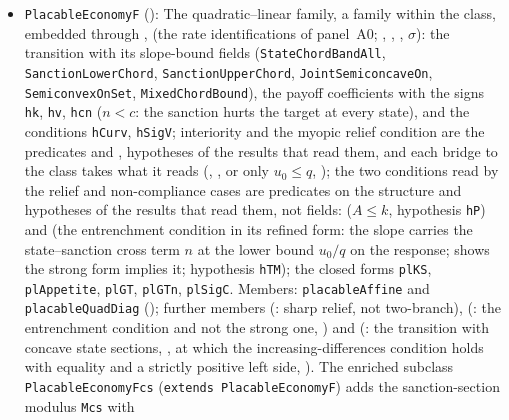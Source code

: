 \begin{itemize}[leftmargin=1.4em,itemsep=1pt]
extension, and on the base class the bound is the predicate , a hypothesis of the results that read it (, ); $q>0$ is the theorem , from the concavity condition; and the joint continuity of the myopic best response, which is not part of the basic game, is the class's own field \texttt{ChordEconomy.$\sigma$\_continuous}, which supplies the instance , so no statement on the class changes. Every member exhibited lies in the two-sided extension and has an upper substitution rate, so this further generality is unwitnessed (Rule~9B).
\item \texttt{PlacableEconomyF} (): The quadratic--linear family, a family within the class, embedded through ,  (the rate identifications of panel~A0; , , , $\sigma$): the transition with its slope-bound fields (\texttt{StateChordBandAll}, \texttt{SanctionLowerChord}, \texttt{SanctionUpperChord}, \texttt{JointSemiconcaveOn}, \texttt{SemiconvexOnSet}, \texttt{MixedChordBound}), the payoff coefficients with the signs \texttt{hk}, \texttt{hv}, \texttt{hcn} ($n<c$: the sanction hurts the target at every state), and the conditions \texttt{hCurv}, \texttt{hSigV}; interiority and the myopic relief condition are the predicates  and , hypotheses of the results that read them, and each bridge to the class takes what it reads (, , or only $u_0\le q$, ); the two conditions read by the relief and non-compliance cases are predicates on the structure and hypotheses of the results that read them, not fields:  ($A\le k$, hypothesis \texttt{hP}) and  (the entrenchment condition in its refined form: the slope  carries the state--sanction cross term $n$ at the lower bound $u_0/q$ on the response;  shows the strong form implies it; hypothesis \texttt{hTM}); the closed forms \texttt{plKS}, \texttt{plAppetite}, \texttt{plGT}, \texttt{plGTn}, \texttt{plSigC}. Members: \texttt{placableAffine} and \texttt{placableQuadDiag} (); further members  (: sharp relief, not two-branch),  (: the entrenchment condition and not the strong one, ) and  (: the transition  with concave state sections, , at which the increasing-differences condition holds with equality and a strictly positive left side, ). The enriched subclass \texttt{PlacableEconomyFcs} (\texttt{extends PlacableEconomyF}) adds the sanction-section modulus \texttt{Mcs} with 
\end{itemize}
